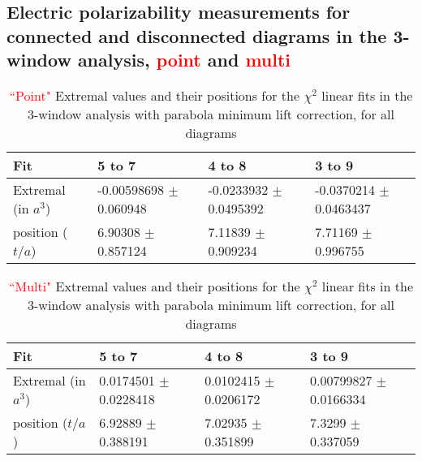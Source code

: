 \subsection{Electric polarizability measurements for connected and disconnected 
diagrams in the 3-window analysis, \textcolor{red}{point} and \textcolor{red}{multi}}
\begin{table}[H]
\begin{center}
    \begin{tabular}{ | l | p{2.6cm} | p{2.4cm} | p{2.6cm} |}
    \hline
     Fit & 5 to 7   &4 to 8   & 3 to 9  \\ \hline
     Extremal (in $a^3$)&    -0.00598698 $\pm$ 0.060948    &    -0.0233932 $\pm$ 0.0495392    &   -0.0370214 $\pm$ 0.0463437   \\ \hline
     position ($t/a$)&    6.90308 $\pm$ 0.857124     &  7.11839 $\pm$ 0.909234    &  7.71169  $\pm$  0.996755   \\ \hline
    \end{tabular}
\end{center}
\caption{\textcolor{red}{``Point"} Extremal values and their positions for the $\chi^2$ linear fits 
in the 3-window analysis with parabola minimum lift correction, for all diagrams}
\label{tab:ExtremaPointAll}
\end{table}
\begin{table}[H]
\begin{center}
    \begin{tabular}{ | l | p{2.6cm} | p{2.3cm} | p{2.6cm} |}
    \hline
     Fit & 5 to 7   &4 to 8   & 3 to 9  \\ \hline
     Extremal (in $a^3$)&    0.0174501 $\pm$ 0.0228418    &    0.0102415 $\pm$ 0.0206172    &   0.00799827 $\pm$ 0.0166334    \\ \hline
     position ($t/a$)&  6.92889 $\pm$ 0.388191    &  7.02935 $\pm$  0.351899   &   7.3299  $\pm$ 0.337059     \\ \hline
    \end{tabular}
\end{center}
\caption{\textcolor{red}{``Multi"} Extremal values and their positions for the $\chi^2$ linear fits in the 
3-window analysis with parabola minimum lift correction, for all diagrams}
\label{tab:ExtremaMultiAll}
\end{table}

